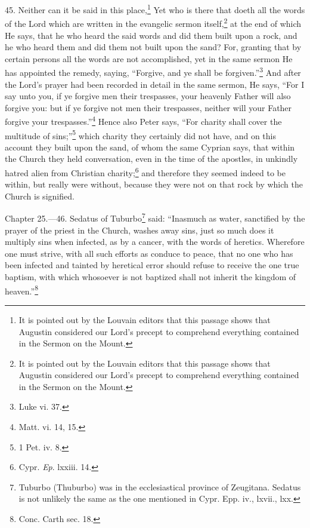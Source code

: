 45. Neither can it be said in this place,\footnote{\par  It is pointed out by the Louvain editors that this passage shows that Augustin considered our Lord’s precept to comprehend everything contained in the Sermon on the Mount.} Yet who is there that doeth all the words of the Lord which are written in the evangelic sermon itself,\footnote{\par  It is pointed out by the Louvain editors that this passage shows that Augustin considered our Lord’s precept to comprehend everything contained in the Sermon on the Mount.} at the end of which He says, that he who heard the said words and did them built upon a rock, and he who heard them and did them not built upon the sand? For, granting that by certain persons all the words are not accomplished, yet in the same sermon He has appointed the remedy, saying, ``Forgive, and ye shall be forgiven.''\footnote{\par  Luke vi. 37.} And after the Lord’s prayer had been recorded in detail in the same sermon, He says, ``For I say unto you, if ye forgive men their trespasses, your heavenly Father will also forgive you: but if ye forgive not men their trespasses, neither will your Father forgive your trespasses.''\footnote{\par  Matt. vi. 14, 15.} Hence also Peter says, ``For charity shall cover the multitude of sins;''\footnote{\par  1 Pet. iv. 8.} which charity they certainly did not have, and on this account they built upon the sand, of whom the same Cyprian says, that within the Church they held conversation, even in the time of the apostles, in unkindly hatred alien from Christian charity;\footnote{\par  Cypr. \emph{Ep}. lxxiii. 14.} and therefore they seemed indeed to be within, but really were without, because they were not on that rock by which the Church is signified.


Chapter 25.—46. Sedatus of Tuburbo\footnote{\par  Tuburbo (Thuburbo) was in the ecclesiastical province of Zeugitana. Sedatus is not unlikely the same as the one mentioned in Cypr. Epp. iv., lxvii., lxx.} said: ``Inasmuch as water, sanctified by the prayer of the priest in the Church, washes away sins, just so much does it multiply sins when infected, as by a cancer, with the words of heretics. Wherefore one must strive, with all such efforts as conduce to peace, that no one who has been infected and tainted by heretical error should refuse to receive the one true baptism, with which whosoever is not baptized shall not inherit the kingdom of heaven.''\footnote{\par  Conc. Carth sec. 18.}

